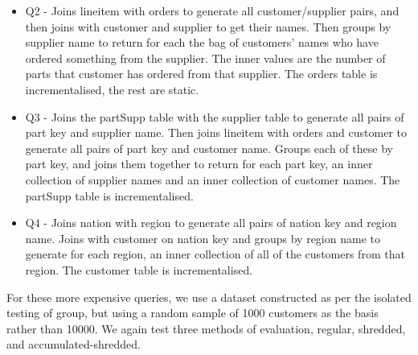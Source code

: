 \begin{itemize}
\item{Q2 - Joins lineitem with orders to generate all customer/supplier pairs, and then joins with customer and supplier to get their names. Then groups by supplier name to return for each the bag of customers' names who have ordered something from the supplier. The inner values are the number of parts that customer has ordered from that supplier. The orders table is incrementalised, the rest are static.}
\item{Q3 - Joins the partSupp table with the supplier table to generate all pairs of part key and supplier name. Then joins lineitem with orders and customer to generate all pairs of part key and customer name. Groups each of these by part key, and joins them together to return for each part key, an inner collection of supplier names and an inner collection of customer names. The partSupp table is incrementalised.}
\item{Q4 - Joins nation with region to generate all pairs of nation key and region name. Joins with customer on nation key and groups by region name to generate for each region, an inner collection of all of the customers from that region. The customer table is incrementalised.} 
\end{itemize}

For these more expensive queries, we use a dataset constructed as per the isolated testing of group, but using a random sample of 1000 customers as the basis rather than 10000. We again test three methods of evaluation, regular, shredded, and accumulated-shredded.

